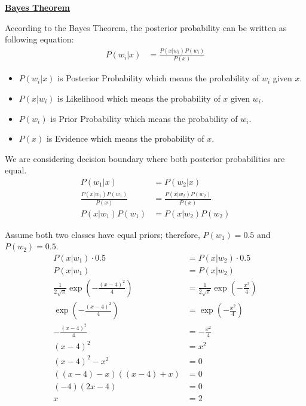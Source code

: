 \documentclass[12pt, a4paper]{article}
\begin{document}
    \pagebreak

            \noindent\underline{\textbf{Bayes Theorem}}
            \vspace{0.5em}

            According to the Bayes Theorem, the posterior probability can be written as following equation:
            \begin{align*}
                P(w_i|x) &= \frac{P(x|w_i)P(w_i)}{P(x)}
            \end{align*}
            \begin{itemize}
                \item $P(w_i|x)$ is Posterior Probability which means the probability of $w_i$ given $x$.
                \item $P(x|w_i)$ is Likelihood which means the probability of $x$ given $w_i$.
                \item $P(w_i)$ is Prior Probability which means the probability of $w_i$.
                \item $P(x)$ is Evidence which means the probability of $x$.
            \end{itemize}

            We are considering decision boundary where both posterior probabilities are equal.
            \begin{align*}
                P(w_1|x) &= P(w_2|x) \\[1em]
                \frac{P(x|w_1)P(w_1)}{P(x)} &= \frac{P(x|w_2)P(w_2)}{P(x)} \\[1em]
                P(x|w_1)P(w_1) &= P(x|w_2)P(w_2)
            \end{align*}
			
			\vspace{0.5em}

            Assume both two classes have equal priors; therefore, $P(w_1) = 0.5$ and $P(w_2) = 0.5$.
            \begin{align*}
                P(x|w_1) \cdot 0.5 &= P(x|w_2) \cdot 0.5 \\
                P(x|w_1) &= P(x|w_2) \\[1em]
                \frac{1}{2\sqrt{\pi}} \exp\left( -\frac{(x - 4)^{2}}{4} \right) &= \frac{1}{2\sqrt{\pi}} \exp\left( -\frac{{x}^{2}}{4} \right) \\[1em]
                \exp\left( -\frac{(x - 4)^{2}}{4} \right) &= \exp\left( -\frac{{x}^{2}}{4} \right) \\[1em]
                -\frac{(x - 4)^{2}}{4} &= -\frac{{x}^{2}}{4} \\[1em]
                (x - 4)^{2} &= {x}^{2} \\
                (x - 4)^{2} - {x}^{2} &= 0 \\
                ((x - 4) - x)((x - 4) + x) &= 0 \\
                (-4)(2x - 4) &= 0 \\
                x &= 2
            \end{align*}
\end{document}
